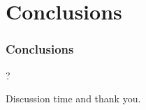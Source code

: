 \section{Conclusions}

\begin{frame}
\frametitle{Conclusions}
?
\end{frame}

\begin{frame}
\Huge{\centerline{Discussion time and thank you.}}
\end{frame}